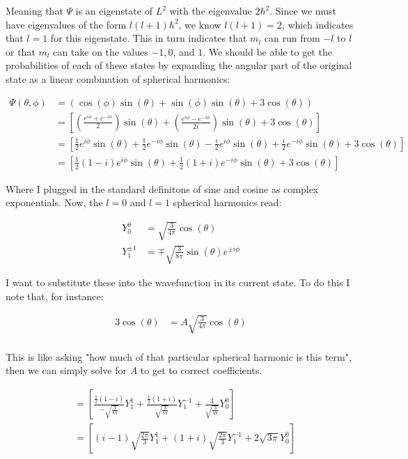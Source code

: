 \documentclass[paper=a4, fontsize=11pt]{scrartcl} %
\numberwithin{equation}{section} %
\numberwithin{figure}{section} %
\numberwithin{table}{section} %
\begin{document}
Meaning that $\Psi$ is an eigenstate of $L^2$ with the eigenvalue $2 \hbar^2$. Since we must have eigenvalues of the form $l(l+1) \hbar^2$, we know $l(l+1) = 2$, which indicates that $l=1$ for this eigenstate. This in turn indicates that $m_l$ can run from $-l$ to $l$ or that $m_l$ can take on the values $-1, 0$, and $1$. We should be able to get the probabilities of each of these states by expanding the angular part of the original state as a linear combination of spherical harmonics:

\begin{align}
\Psi(\theta, \phi) &= (\cos(\phi)\sin(\theta) + \sin(\phi)\sin(\theta) + 3 \cos(\theta)) \\
&=\left[ \left(\frac{e^{i \phi} + e^{- i \phi}}{2} \right) \sin(\theta) + \left(\frac{e^{i \phi} - e^{- i \phi}}{2i}\right)\sin(\theta) + 3 \cos(\theta) \right] \\
&= \left[\frac{1}{2}e^{i \phi}\sin(\theta) + \frac{1}{2}e^{-i \phi}\sin(\theta) - \frac{i}{2}e^{i \phi}\sin(\theta) + \frac{i}{2}e^{- i \phi}\sin(\theta) + 3 \cos(\theta)\right] \\
&= \left[\frac{1}{2}(1 - i)e^{i \phi}\sin(\theta) + \frac{1}{2}(1 + i)e^{-i \phi}\sin(\theta) + 3 \cos(\theta)\right]
\end{align}

Where I plugged in the standard definitons of sine and cosine as complex exponentials. Now, the $l=0$ and $l=1$ spherical harmonics read:

\begin{align}
Y^0_0 &= \sqrt{\frac{3}{4 \pi}} \cos(\theta) \\
Y^{\pm 1}_1 &= \mp \sqrt{\frac{3}{8 \pi}}\sin(\theta)e^{\pm i \phi}
\end{align}

I want to substitute these into the wavefunction in its current state. To do this I note that, for instance:

\begin{align}
3\cos(\theta) &= A\sqrt{\frac{3}{4 \pi}}\cos(\theta) \\
\end{align}

This is like asking "how much of that particular spherical harmonic is this term", then we can simply solve for $A$ to get to correct coefficients. 

\begin{align}
&= \left[\frac{\frac{1}{2}(1 - i)}{-\sqrt{\frac{3}{8 \pi}}}Y^1_1 + \frac{\frac{1}{2}(1 + i)}{\sqrt{\frac{3}{8 \pi}}}Y^{-1}_1 + \frac{3}{\sqrt{\frac{3}{4 \pi}}}Y^0_0 \right] \\
&= \left[(i - 1)\sqrt{\frac{2 \pi}{3}}Y^1_1 + (1 + i)\sqrt{\frac{2 \pi}{3}}Y^{-1}_1 + 2 \sqrt{3 \pi}Y^0_0 \right]
\end{align}
\end{document}
